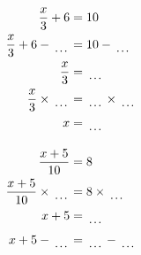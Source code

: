 \documentclass[12pt]{article}
\newcounter{minipagecount}
\begin{document}
\begin{multicols}{2}
\begin{minipage}[t]{0.45\textwidth}
    \raggedright %
    \begin{align*} %
        \frac{x}{3} + 6 &= 10\\
        \frac{x}{3} + 6 - \dotuline{\hspace{5mm}} &= 10 - \dotuline{\hspace{5mm}}\\
        \frac{x}{3} &= \dotuline{\hspace{5mm}}\\
        \frac{x}{3} \times\dotuline{\hspace{5mm}} &= \dotuline{\hspace{5mm}} \times\dotuline{\hspace{5mm}}\\
        x &= \dotuline{\hspace{5mm}}\\
    \end{align*}
\end{minipage} %
\noindent{(\theminipagecount)}\hspace{0.1mm} %
\begin{minipage}[t]{0.45\textwidth} %
    \vspace{-26pt}  %
    \raggedright %
    \begin{align*} %
        \frac{x + 5}{10} &= 8\\
        \frac{x + 5}{10} \times\dotuline{\hspace{5mm}} &= 8 \times\dotuline{\hspace{5mm}}\\
        x + 5 &= \dotuline{\hspace{5mm}}\\
        x + 5 - \dotuline{\hspace{5mm}} &= \dotuline{\hspace{5mm}} - \dotuline{\hspace{5mm}}\\

\end{align*}
\end{minipage}
\end{multicols}
\end{document}
